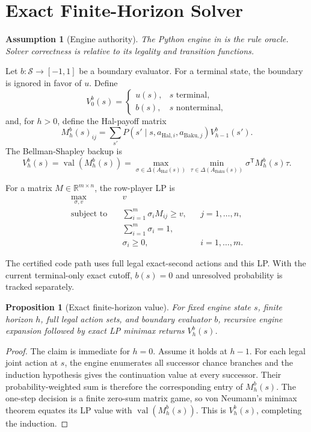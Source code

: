 \documentclass[11pt]{article}
\newtheorem{assumption}{Assumption}
\newtheorem{proposition}{Proposition}
\newcommand{\hal}{\mathrm{Hal}}
\newcommand{\baku}{\mathrm{Baku}}
\newcommand{\states}{\mathcal{S}}
\newcommand{\simplex}{\Delta}
\newcommand{\val}{\operatorname{val}}
\begin{document}
\section{Exact Finite-Horizon Solver}

\begin{assumption}[Engine authority]
The Python engine in  is the rule oracle. Solver correctness
is relative to its legality and transition functions.
\end{assumption}

Let \(b:\states\to[-1,1]\) be a boundary evaluator. For a terminal state,
the boundary is ignored in favor of \(u\). Define
\[
V_0^b(s)=
\begin{cases}
u(s), & s\text{ terminal},\\
b(s), & s\text{ nonterminal},
\end{cases}
\]
and, for \(h>0\), define the Hal-payoff matrix
\[
M_h^b(s)_{ij}
=
\sum_{s'}P(s'\mid s,a_{\hal,i},a_{\baku,j})
V_{h-1}^b(s').
\]
The Bellman-Shapley backup is
\[
V_h^b(s)=\val\!\left(M_h^b(s)\right)
=
\max_{\sigma\in\simplex(A_{\hal}(s))}
\min_{\tau\in\simplex(A_{\baku}(s))}
\sigma^{\mathsf T}M_h^b(s)\tau.
\]

For a matrix \(M\in\mathbb{R}^{m\times n}\), the row-player LP is
\[
\begin{aligned}
\max_{\sigma,v}\quad &v\\
\text{subject to}\quad
&\sum_{i=1}^{m}\sigma_i M_{ij}\ge v,
&&j=1,\ldots,n,\\
&\sum_{i=1}^{m}\sigma_i=1,\\
&\sigma_i\ge0,
&&i=1,\ldots,m.
\end{aligned}
\]

The certified code path uses full legal exact-second actions and this LP. With
the current terminal-only exact cutoff, \(b(s)=0\) and unresolved probability
is tracked separately.

\begin{proposition}[Exact finite-horizon value]
For fixed engine state \(s\), finite horizon \(h\), full legal action sets,
and boundary evaluator \(b\), recursive engine expansion followed by exact LP
minimax returns \(V_h^b(s)\).
\end{proposition}

\begin{proof}
The claim is immediate for \(h=0\). Assume it holds at \(h-1\). For each
legal joint action at \(s\), the engine enumerates all successor chance
branches and the induction hypothesis gives the continuation value at every
successor. Their probability-weighted sum is therefore the corresponding
entry of \(M_h^b(s)\). The one-step decision is a finite zero-sum matrix game,
so von Neumann's minimax theorem equates its LP value with
\(\val(M_h^b(s))\). This is \(V_h^b(s)\), completing the induction.
\end{proof}
\end{document}
